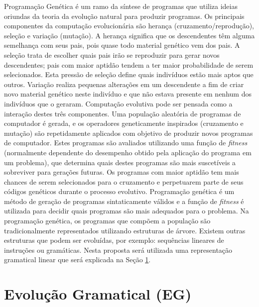 Programação Genética \cite{burke2009exploring} é um ramo da síntese de programas que utiliza ideias oriundas da teoria da evolução natural para produzir programas. Os principais componentes da computação evolucionária são herança (cruzamento/reprodução), seleção e variação (mutação). A herança significa que os descendentes  têm alguma semelhança com seus pais, pois quase todo material genético vem dos pais. A seleção trata de escolher quais pais irão se reproduzir para gerar novos descendentes; pais com maior aptidão tendem a ter maior probabilidade de serem selecionados. Esta pressão de seleção define quais indivíduos estão mais aptos que outros. Variação realiza pequenas alterações em um descendente a fim de criar novo material genético neste indivíduo e que não estava presente em nenhum dos indivíduos que o geraram. Computação evolutiva pode ser pensada como a interação destes três componentes. 
Uma população aleatória de programas de computador é gerada, e os operadores geneticamente inspirados (cruzamento e mutação) são repetidamente aplicados com objetivo de produzir novos programas de computador. Estes programas são avaliados utilizando uma função de \textit{fitness} (normalmente dependente do desempenho obtido pela aplicação do programa em um problema), que determina quais destes programas são mais suscetíveis a sobreviver para gerações futuras. Os programas com maior aptidão tem mais chances de serem selecionados para o cruzamento e perpetuarem parte de seus códigos genéticos durante o processo evolutivo. 
Programação genética é um método de geração de programas sintaticamente válidos e a função de \textit{fitness} é utilizada para decidir quais programas são mais adequados para o problema.
Na programação genética, os programas que compõem a população são tradicionalmente representados utilizando estruturas de árvore. Existem outras estruturas que podem ser evoluídas, por exemplo: sequências lineares de instruções ou gramáticas. Nesta proposta será utilizada uma representação gramatical linear que será explicada na Seção \ref{subsubsection:EvolucaoGramatical}.

\section{Evolução Gramatical (EG)}
\label{subsubsection:EvolucaoGramatical}

